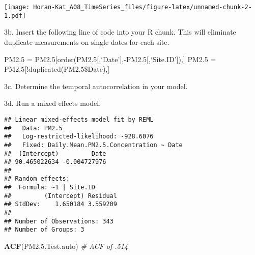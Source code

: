 \documentclass[]{article}
\newenvironment{Shaded}{\begin{snugshade}}{\end{snugshade}}
\newcommand{\KeywordTok}[1]{\textcolor[rgb]{0.13,0.29,0.53}{\textbf{#1}}}
\newcommand{\DataTypeTok}[1]{\textcolor[rgb]{0.13,0.29,0.53}{#1}}
\newcommand{\DecValTok}[1]{\textcolor[rgb]{0.00,0.00,0.81}{#1}}
\newcommand{\FloatTok}[1]{\textcolor[rgb]{0.00,0.00,0.81}{#1}}
\newcommand{\StringTok}[1]{\textcolor[rgb]{0.31,0.60,0.02}{#1}}
\newcommand{\CommentTok}[1]{\textcolor[rgb]{0.56,0.35,0.01}{\textit{#1}}}
\newcommand{\OperatorTok}[1]{\textcolor[rgb]{0.81,0.36,0.00}{\textbf{#1}}}
\newcommand{\NormalTok}[1]{#1}
\begin{document}
\texttt{[image: Horan-Kat\_A08\_TimeSeries\_files/figure-latex/unnamed-chunk-2-1.pdf]}

3b. Insert the following line of code into your R chunk. This will
eliminate duplicate measurements on single dates for each site.

PM2.5 = PM2.5{[}order(PM2.5{[},`Date'{]},-PM2.5{[},`Site.ID'{]}),{]}
PM2.5 = PM2.5{[}!duplicated(PM2.5\$Date),{]}

3c. Determine the temporal autocorrelation in your model.

3d. Run a mixed effects model.

\begin{Shaded}
\end{Shaded}

\begin{verbatim}
## Linear mixed-effects model fit by REML
##   Data: PM2.5 
##   Log-restricted-likelihood: -928.6076
##   Fixed: Daily.Mean.PM2.5.Concentration ~ Date 
##  (Intercept)         Date 
## 90.465022634 -0.004727976 
## 
## Random effects:
##  Formula: ~1 | Site.ID
##         (Intercept) Residual
## StdDev:    1.650184 3.559209
## 
## Number of Observations: 343
## Number of Groups: 3
\end{verbatim}

\begin{Shaded}
\begin{Highlighting}[]
\KeywordTok{ACF}\NormalTok{(PM2.}\FloatTok{5.}\NormalTok{Test.auto) }\CommentTok{# ACF of .514}
\end{Highlighting}
\end{Shaded}
\end{document}
